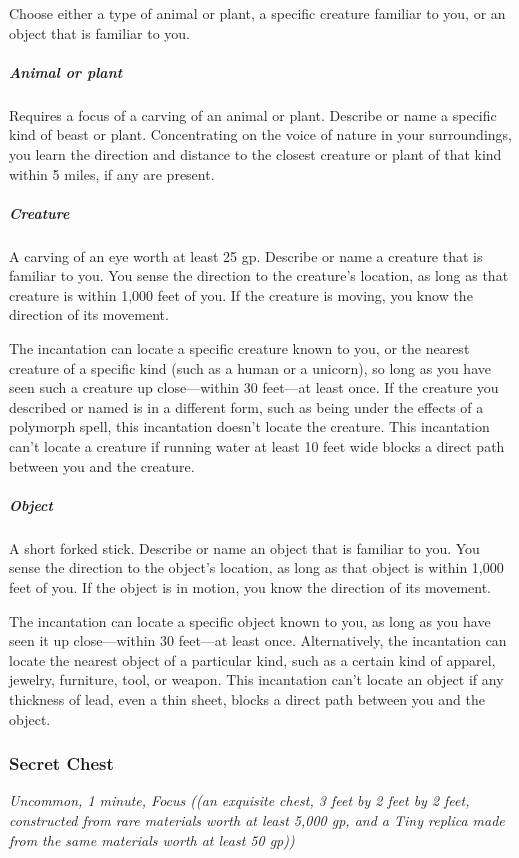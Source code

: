 Choose either a type of animal or plant, a specific creature familiar to you, or an object that is familiar to you.

\subparagraph*{Animal or plant} Requires a focus of a carving of an animal or plant. Describe or name a specific kind of beast or plant. Concentrating on the voice of nature in your surroundings, you learn the direction and distance to the closest creature or plant of that kind within 5 miles, if any are present.

\subparagraph*{Creature} A carving of an eye worth at least 25 gp. Describe or name a creature that is familiar to you. You sense the direction to the creature's location, as long as that creature is within 1,000 feet of you. If the creature is moving, you know the direction of its movement.

The incantation can locate a specific creature known to you, or the nearest creature of a specific kind (such as a human or a unicorn), so long as you have seen such a creature up close—within 30 feet—at least once. If the creature you described or named is in a different form, such as being under the effects of a polymorph spell, this incantation doesn't locate the creature. This incantation can't locate a creature if running water at least 10 feet wide blocks a direct path between you and the creature.

\subparagraph*{Object} A short forked stick. Describe or name an object that is familiar to you. You sense the direction to the object's location, as long as that object is within 1,000 feet of you. If the object is in motion, you know the direction of its movement.

The incantation can locate a specific object known to you, as long as you have seen it up close—within 30 feet—at least once. Alternatively, the incantation can locate the nearest object of a particular kind, such as a certain kind of apparel, jewelry, furniture, tool, or weapon. This incantation can't locate an object if any thickness of lead, even a thin sheet, blocks a direct path between you and the object.

\subsubsection{Secret Chest}
\textit{Uncommon, 1 minute, Focus ((an exquisite chest, 3 feet by 2 feet by 2 feet, constructed from rare materials worth at least 5,000 gp, and a Tiny replica made from the same materials worth at least 50 gp))}


